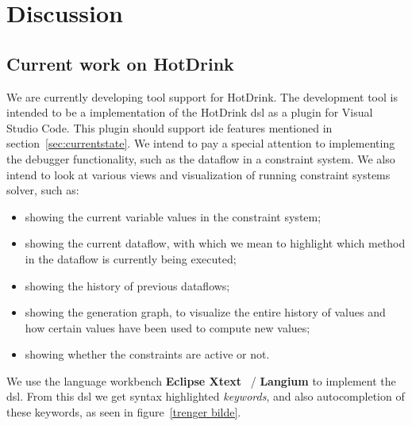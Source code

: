 \chapter{Discussion}


\section{Current work on HotDrink}
We are currently developing tool support for HotDrink. The development tool is intended 
to be a implementation of the HotDrink \gls{dsl} as a plugin for Visual Studio Code. 
This plugin should support \gls{ide} features mentioned in section~\ref{sec:currentstate}. 
We intend to pay a special attention to implementing the debugger functionality, such as 
the dataflow in a constraint system. We also intend to look at various views and 
visualization of running constraint systems solver, such as: 
\begin{itemize}
    \item showing the current variable values in the constraint system;
    \item showing the current dataflow, with which we mean to highlight which method in the dataflow is currently being executed;
    \item showing the history of previous dataflows;
    \item showing the generation graph, to visualize the entire history of values and how certain values have been used to compute new values;
    \item showing whether the constraints are active or not.
\end{itemize}

We use the language workbench \textbf{Eclipse Xtext}~\cite{eysholdt_xtext:_2010} / 
\textbf{Langium} to implement the \gls{dsl}. From this \gls{dsl} we get syntax 
highlighted \textit{keywords}, and also autocompletion of these keywords, as seen in figure~\ref{trenger bilde}. 
